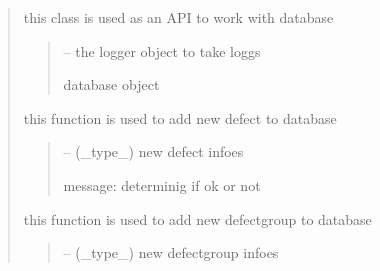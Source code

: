 \documentclass[letterpaper,10pt,english]{sphinxmanual}
\begin{document}
\begin{quote}
\begin{savenotes}
\begin{fulllineitems}
\sphinxAtStartPar
this class is used as an API to work with database
\begin{quote}\begin{description}
\sphinxAtStartPar
{} – the logger object to take loggs

\sphinxAtStartPar
database object

\end{description}\end{quote}

\begin{savenotes}\begin{fulllineitems}
\label{\detokenize{setting/database_utils:oxin.database_utils.dataBaseUtils.add_defect}}
\pysigstartsignatures
{}
\pysigstopsignatures
\sphinxAtStartPar
this function is used to add new defect to database
\begin{quote}\begin{description}
\sphinxAtStartPar
{} – (\_type\_) new defect infoes

\sphinxAtStartPar
message: determinig if ok or not

\end{description}\end{quote}

\end{fulllineitems}\end{savenotes}


\begin{savenotes}\begin{fulllineitems}
\label{\detokenize{setting/database_utils:oxin.database_utils.dataBaseUtils.add_defect_group}}
\pysigstartsignatures
{}
\pysigstopsignatures
\sphinxAtStartPar
this function is used to add new defect\sphinxhyphen{}group to database
\begin{quote}\begin{description}
\sphinxAtStartPar
{} – (\_type\_) new defect\sphinxhyphen{}group infoes


\end{description}
\end{quote}
\end{fulllineitems}
\end{savenotes}
\end{fulllineitems}
\end{savenotes}
\end{quote}
\end{document}
